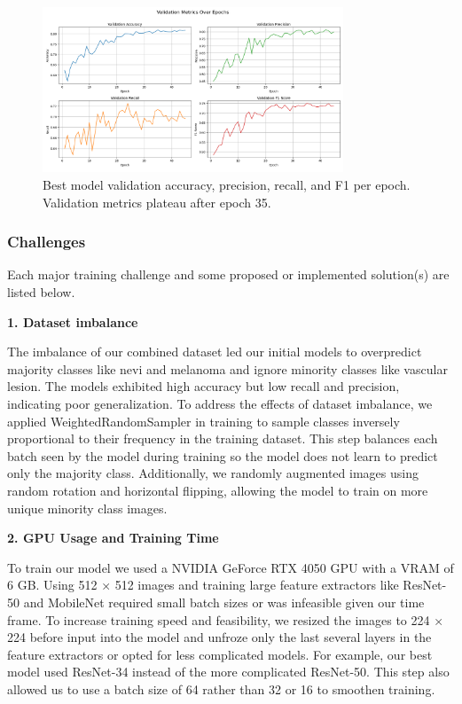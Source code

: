 \documentclass{article} %
\begin{document}
\begin{figure}[h]
\begin{center}
\includegraphics[width=0.8\textwidth]{Figs/validation_metrics.png}
\end{center}
\caption{Best model validation accuracy, precision, recall, and F1 per epoch. Validation metrics plateau after epoch 35.}
\end{figure}

\subsubsection{Challenges}

Each major training challenge and some proposed or implemented solution(s) are listed below.

\textbf{1. Dataset imbalance}

The imbalance of our combined dataset led our initial models to overpredict majority classes like nevi and melanoma and ignore minority classes like vascular lesion. The models exhibited high accuracy but low recall and precision, indicating poor generalization. To address the effects of dataset imbalance, we applied WeightedRandomSampler in training to sample classes inversely proportional to their frequency in the training dataset. This step balances each batch seen by the model during training so the model does not learn to predict only the majority class. Additionally, we randomly augmented images using random rotation and horizontal flipping, allowing the model to train on more unique minority class images.

\textbf{2. GPU Usage and Training Time}

To train our model we used a NVIDIA GeForce RTX 4050 GPU with a VRAM of 6 GB. Using 512 × 512 images and training large feature extractors like ResNet-50 and MobileNet required small batch sizes or was infeasible given our time frame. To increase training speed and feasibility, we resized the images to 224 × 224 before input into the model and unfroze only the last several layers in the feature extractors or opted for less complicated models. For example, our best model used ResNet-34 instead of the more complicated ResNet-50. This step also allowed us to use a batch size of 64 rather than 32 or 16 to smoothen training.
\end{document}
